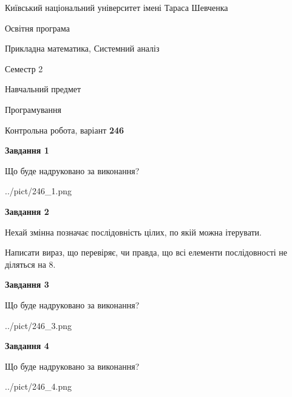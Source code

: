 \documentclass[12pt, ukrainian]{article}
\begin{document}
{{\begin {small}\par
{ \center  Київський національний університет імені Тараса Шевченка \par}
{\parbox {5 cm}{Освітня програма \hfill}{\parbox {8 cm}{Прикладна математика, Системний аналіз \hfill}}\parbox {5 cm}{\hfill Семестр 2}}\par
{\parbox {5 cm} {Навчальний предмет \hfill}\parbox {7 cm}{Програмування \hfill}\parbox {6cm}{\hfill}\par}\vspace{-7pt} \end{small}}{\center Контрольна робота, варіант  \No \textbf
{ 246 }\par}}
{
\begin {large}
{\begin {center}\textbf{Завдання 1}\end {center}}\par
Що буде надруковано за виконання?\par\par
\begin{center}
	{../pict/246_1.png}
\end{center}
\newpage

{\begin {center}\textbf{Завдання 2}\end {center}}\par
Нехай змінна  позначає послідовність цілих, по якій можна ітерувати.

Написати вираз, що перевіряє, чи правда, що всі елементи послідовності не діляться на 8.\par
\newpage

{\begin {center}\textbf{Завдання 3}\end {center}}\par
Що буде надруковано за виконання?\par
\begin{center}
	{../pict/246_3.png}
\end{center}
\newpage

{\begin {center}\textbf{Завдання 4}\end {center}}\par
Що буде надруковано за виконання?\par
\begin{center}
	{../pict/246_4.png}
\end{center}
\newpage


\end{large}}
\end{document}
